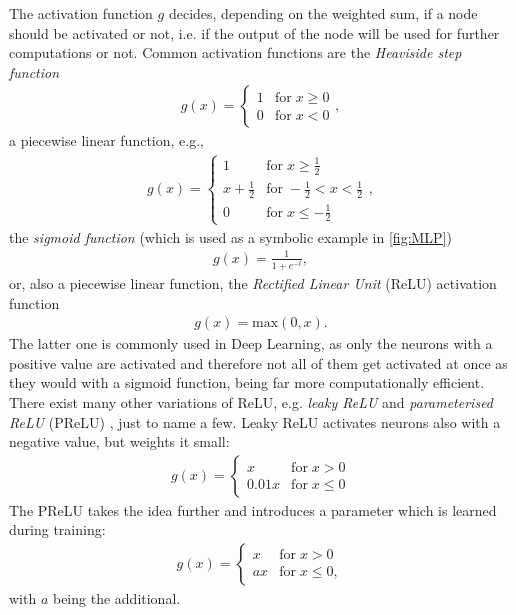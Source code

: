 The activation function $g$ decides, depending on the weighted sum, if a node should be activated or not, i.e. if the output of the node will be used for further computations or not. Common activation functions are the \textit{Heaviside step function}
\begin{align}
    g(x) = 
        \begin{cases}
        1 & \mathrm{for}\;  x \geq 0 \\
        0 & \mathrm{for}\; x < 0
        \end{cases},
\end{align}
a piecewise linear function, e.g., 
\begin{align}
    g(x) = 
        \begin{cases}
        1 & \mathrm{for}\; x \geq \frac{1}{2} \\
        x + \frac{1}{2} & \mathrm{for}\;  -\frac{1}{2} < x < \frac{1}{2} \\
        0 & \mathrm{for}\; x \leq -\frac{1}{2}
        \end{cases},
\end{align}
the \textit{sigmoid function} (which is used as a symbolic example in \cref{fig:MLP})
\begin{align}
    g(x) = \frac{1}{1+e^{-t}},
\end{align}
or, also a piecewise linear function, the \textit{Rectified Linear Unit} (ReLU) activation function
\begin{align}
    g(x) = \mathrm{max}(0,x).
\end{align}
The latter one is commonly used in Deep Learning, as only the neurons with a positive value are activated and therefore not all of them get activated at once as they would with a sigmoid function, being far more computationally efficient. There exist many other variations of ReLU, e.g. \textit{leaky ReLU} \cite{maas_rectifier_2013} and \textit{parameterised ReLU} (PReLU) \cite{he_delving_2015}, just to name a few. Leaky ReLU activates neurons also with a negative value, but weights it small:
\begin{align}
    g(x) = 
        \begin{cases}
        x & \mathrm{for}\;  x > 0 \\
        0.01x & \mathrm{for}\; x \leq 0
        \end{cases}
\end{align}
The PReLU takes the idea further and introduces a parameter which is learned during training:
\begin{align}
    g(x) = 
        \begin{cases}
        x & \mathrm{for}\;  x > 0 \\
        ax & \mathrm{for}\; x \leq 0,
        \end{cases}
\end{align}
with $a$ being the additional.

